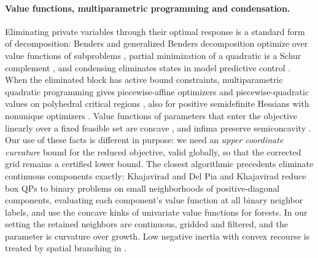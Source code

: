 \paragraph{Value functions, multiparametric programming and condensation.}
Eliminating private variables through their optimal response is a standard form of
decomposition: Benders and generalized Benders decomposition optimize over value functions of
subproblems \cite{Benders1962,Geoffrion1972}, partial minimization of a quadratic is a Schur
complement \cite{Zhang2005Schur}, and condensing eliminates states in model predictive control
\cite{BockPlitt1984,JerezKerriganConstantinides2012,Axehill2015}. When the eliminated block has
active bound constraints, multiparametric quadratic programming gives piecewise-affine optimizers
and piecewise-quadratic values on polyhedral critical regions
\cite{BemporadEtAl2002,TondelJohansenBemporad2003}, also for positive semidefinite Hessians with
nonunique optimizers \cite{SpjotvoldTondelJohansen2005,SpjotvoldTondelJohansen2007,
SpjotvoldEtAl2006,PatrinosSarimveis2011}. Value functions of parameters that enter the objective
linearly over a fixed feasible set are concave \cite{MangasarianRosen1964,FiaccoKyparisis1986},
and infima preserve semiconcavity \cite{CannarsaSinestrari2004}. Our use of these facts is
different in purpose: we need an \emph{upper coordinate curvature} bound for the reduced
objective, valid globally, so that the corrected grid remains a certified lower bound. The
closest algorithmic precedents eliminate continuous components exactly: Khajavirad
\cite{Khajavirad2026PolyBox} and Del Pia and Khajavirad \cite{DelPiaKhajavirad2026} reduce box
QPs to binary problems on small neighborhoods of positive-diagonal components, evaluating each
component's value function at all binary neighbor labels, and use the concave kinks of univariate
value functions for forests. In our setting the retained neighbors are continuous, gridded and
filtered, and the parameter is curvature over growth. Low negative inertia with convex recourse
is treated by spatial branching in \cite{Vavasis1992,LuoBaiLimPeng2019}.

